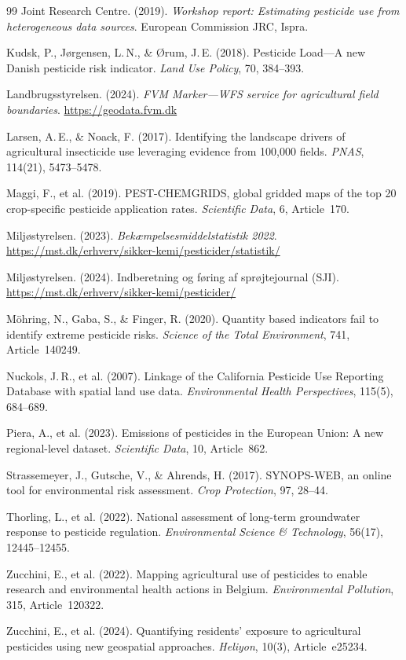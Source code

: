 \documentclass[12pt,a4paper]{article}
\begin{document}
\begin{thebibliography}{99}
 Joint Research Centre. (2019). \textit{Workshop report: Estimating pesticide use from heterogeneous data sources}. European Commission JRC, Ispra.

 Kudsk, P., J\o rgensen, L.\,N., \& \O rum, J.\,E. (2018). Pesticide Load---A new Danish pesticide risk indicator. \textit{Land Use Policy}, 70, 384--393.

 Landbrugsstyrelsen. (2024). \textit{FVM Marker---WFS service for agricultural field boundaries}. \url{https://geodata.fvm.dk}

 Larsen, A.\,E., \& Noack, F. (2017). Identifying the landscape drivers of agricultural insecticide use leveraging evidence from 100,000 fields. \textit{PNAS}, 114(21), 5473--5478.

 Maggi, F., et al. (2019). PEST-CHEMGRIDS, global gridded maps of the top 20 crop-specific pesticide application rates. \textit{Scientific Data}, 6, Article~170.

 Milj\o styrelsen. (2023). \textit{Bek\ae mpelsesmiddelstatistik 2022}. \url{https://mst.dk/erhverv/sikker-kemi/pesticider/statistik/}

 Milj\o styrelsen. (2024). Indberetning og f\o ring af spr\o jtejournal (SJI). \url{https://mst.dk/erhverv/sikker-kemi/pesticider/}

 M\"ohring, N., Gaba, S., \& Finger, R. (2020). Quantity based indicators fail to identify extreme pesticide risks. \textit{Science of the Total Environment}, 741, Article~140249.

 Nuckols, J.\,R., et al. (2007). Linkage of the California Pesticide Use Reporting Database with spatial land use data. \textit{Environmental Health Perspectives}, 115(5), 684--689.

 Piera, A., et al. (2023). Emissions of pesticides in the European Union: A new regional-level dataset. \textit{Scientific Data}, 10, Article~862.

 Strassemeyer, J., Gutsche, V., \& Ahrends, H. (2017). SYNOPS-WEB, an online tool for environmental risk assessment. \textit{Crop Protection}, 97, 28--44.

 Thorling, L., et al. (2022). National assessment of long-term groundwater response to pesticide regulation. \textit{Environmental Science \& Technology}, 56(17), 12445--12455.

 Zucchini, E., et al. (2022). Mapping agricultural use of pesticides to enable research and environmental health actions in Belgium. \textit{Environmental Pollution}, 315, Article~120322.

 Zucchini, E., et al. (2024). Quantifying residents' exposure to agricultural pesticides using new geospatial approaches. \textit{Heliyon}, 10(3), Article~e25234.

\end{thebibliography}
\end{document}

